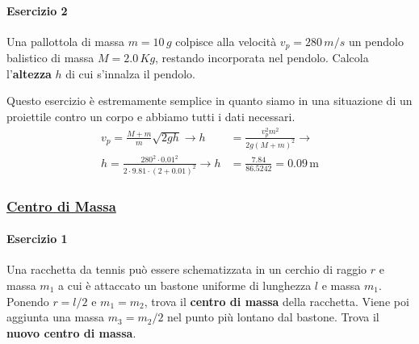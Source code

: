 \paragraph{Esercizio 2}
Una pallottola di massa $m = 10\,g$ colpisce alla velocità $v_p = 280\,m/s$ un pendolo balistico di
massa $M = 2.0\,Kg$, restando incorporata nel pendolo. Calcola l'\textbf{altezza} $h$ di cui s'innalza
il pendolo.
\divisor

Questo esercizio è estremamente semplice in quanto siamo in una situazione di un proiettile contro
un corpo e abbiamo tutti i dati necessari.
\begin{align*}
v_p = \frac{M+m}{m}\sqrt{2gh} \rightarrow h &= \frac{v_p^2m^2}{2g\left(M+m\right)^2} \rightarrow\\
h = \frac{280^2\cdot0.01^2}{2\cdot9.81\cdot(2+0.01)^2} \rightarrow h &= \frac{7.84}{86.5242} = 
\boxed{0.09\,\text{m}}
\end{align*}

\subsubsection*{\hyperref[subsec:dinamica:cm]{Centro di Massa}}\label{ex:cm}
\paragraph{Esercizio 1}
Una racchetta da tennis può essere schematizzata in un cerchio di raggio $r$ e massa $m_1 $ a cui è 
attaccato un bastone uniforme di lunghezza $l$ e massa $m_1$. Ponendo $r = l/2$ e $m_1=m_2$, trova il
\textbf{centro di massa} della racchetta. Viene poi aggiunta una massa $m_3 = m_2/2$ nel punto più
lontano dal bastone. Trova il \textbf{nuovo centro di massa}.

\begin{center}
\end{center}

\divisor

